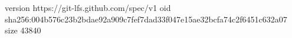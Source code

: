 version https://git-lfs.github.com/spec/v1
oid sha256:004b576c23b2bdae92a909c7fef7dad33f047e15ae32bcfa74c2f6451c632a07
size 43840
